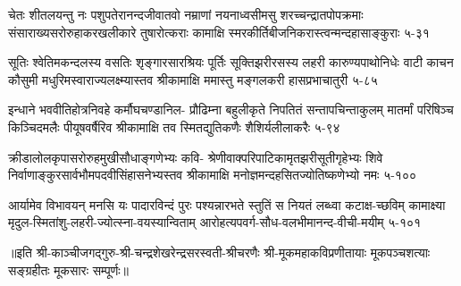 \annofourlineindentedshloka
{चेतः शीतलयन्तु नः पशुपतेरानन्दजीवातवो}
{नम्राणां नयनाध्वसीमसु शरच्चन्द्रातपोपक्रमाः}
{संसाराख्यसरोरुहाकरखलीकारे तुषारोत्कराः}
{कामाक्षि स्मरकीर्तिबीजनिकरास्त्वन्मन्दहासाङ्कुराः}
{५-३१}

\annofourlineindentedshloka
{सूतिः श्वेतिमकन्दलस्य वसतिः शृङ्गारसारश्रियः}
{पूर्तिः सूक्तिझरीरसस्य लहरी कारुण्यपाथोनिधेः}
{वाटी काचन कौसुमी मधुरिमस्वाराज्यलक्ष्म्यास्तव}
{श्रीकामाक्षि ममास्तु मङ्गलकरी हासप्रभाचातुरी}
{५-८५}

\annofourlineindentedshloka
{इन्धाने भववीतिहोत्रनिवहे कर्मौघचण्डानिल-}
{प्रौढिम्ना बहुलीकृते निपतितं सन्तापचिन्ताकुलम्}
{मातर्मां परिषिञ्च किञ्चिदमलैः पीयूषवर्षैरिव}
{श्रीकामाक्षि तव स्मितद्युतिकणैः शैशिर्यलीलाकरैः}
{५-९४}

\annofourlineindentedshloka
{क्रीडालोलकृपासरोरुहमुखीसौधाङ्गणेभ्यः कवि-}
{श्रेणीवाक्परिपाटिकामृतझरीसूतीगृहेभ्यः शिवे}
{निर्वाणाङ्कुरसार्वभौमपदवीसिंहासनेभ्यस्तव}
{श्रीकामाक्षि मनोज्ञमन्दहसितज्योतिष्कणेभ्यो नमः}
{५-१००}

\annofourlineindentedshloka
{आर्यामेव विभावयन् मनसि यः पादारविन्दं पुरः}
{पश्यन्नारभते स्तुतिं स नियतं लब्ध्वा कटाक्ष-च्छविम्}
{कामाक्ष्या मृदुल-स्मितांशु-लहरी-ज्योत्स्ना-वयस्यान्विताम्}
{आरोहत्यपवर्ग-सौध-वलभीमानन्द-वीची-मयीम्}
{५-१०१}

॥इति श्री-काञ्चीजगद्गुरु-श्री-चन्द्रशेखरेन्द्रसरस्वती-श्रीचरणैः श्री-मूकमहाकविप्रणीतायाः मूकपञ्चशत्याः सङ्ग्रहीतः मूकसारः सम्पूर्णः॥

\hyperref[sec:start]{\closesub}

\setlength{\shlokaspaceskip}{24pt}
\endgroup